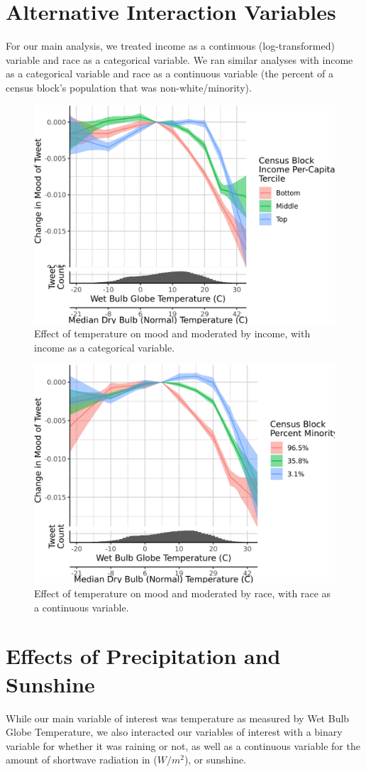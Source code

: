 \documentclass{article}
\begin{document}
\newpage
\section{Alternative Interaction Variables}
For our main analysis, we treated income as a continuous (log-transformed) variable and race as a categorical variable.  We ran similar analyses with income as a categorical variable and race as a continuous variable (the percent of a census block's population that was non-white/minority).

\begin{figure}[H]
  \centering
  \includegraphics[width=0.6\linewidth]{../res/wbgt-income_q.png}
  \caption{Effect of temperature on mood and moderated by income, with income as a categorical variable.}
\end{figure}

\begin{figure}[H]
  \centering
  \includegraphics[width=0.6\linewidth]{../res/wbgt-race.png}
  \caption{Effect of temperature on mood and moderated by race, with race as a continuous variable.}
\end{figure}

\newpage
\section{Effects of Precipitation and Sunshine}
While our main variable of interest was temperature as measured by Wet Bulb Globe Temperature, we also interacted our variables of interest with a binary variable for whether it was raining or not, as well as a continuous variable for the amount of shortwave radiation in ($W/m^2$), or sunshine.
\end{document}

